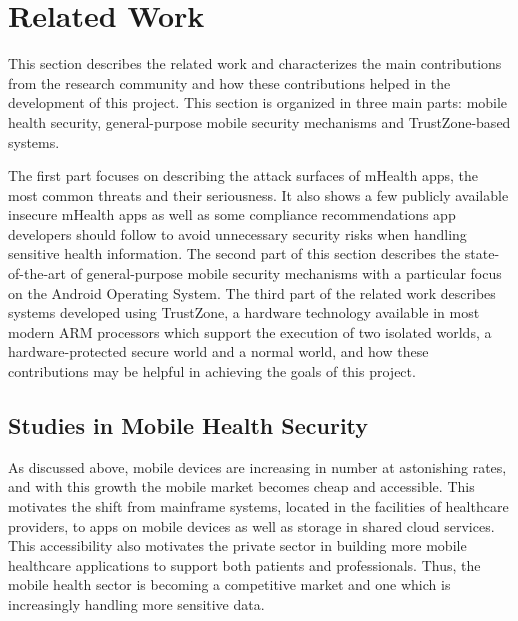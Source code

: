 
% 
% 
\section{Related Work}
\label{sec:relatedWork}


This section describes the related work and characterizes the main contributions from the research community and how these contributions helped in the development of this project. This section is organized in three main parts: mobile health security, general-purpose mobile security mechanisms and TrustZone-based systems.

The first part focuses on describing the attack surfaces of mHealth apps, the most common threats and their seriousness. It also shows a few publicly available insecure mHealth apps as well as some compliance recommendations app developers should follow to avoid unnecessary security risks when handling sensitive health information.
The second part of this section describes the state-of-the-art of general-purpose mobile security mechanisms with a particular focus on the Android Operating System.
The third part of the related work describes systems developed using TrustZone, a hardware technology available in most modern ARM processors which support the execution of two isolated worlds, a hardware-protected secure world and a normal world, and how these contributions may be helpful in achieving the goals of this project. 

\subsection{Studies in Mobile Health Security}
\label{sec:mhealth}

As discussed above, mobile devices are increasing in number at astonishing rates, and with this growth the mobile market becomes cheap and accessible. This motivates the shift from mainframe systems, located in the facilities of healthcare providers, to apps on mobile devices as well as storage in shared cloud services. This accessibility also motivates the private sector in building more mobile healthcare applications to support both patients and professionals. Thus, the mobile health sector is becoming a competitive market and one which is increasingly handling more sensitive data.

